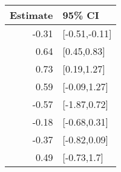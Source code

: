 \begin{tabular}{rl}
  \hline
Estimate & 95\% CI \\ 
  \hline
-0.31 & [-0.51,-0.11] \\ 
  0.64 & [0.45,0.83] \\ 
  0.73 & [0.19,1.27] \\ 
  0.59 & [-0.09,1.27] \\ 
  -0.57 & [-1.87,0.72] \\ 
  -0.18 & [-0.68,0.31] \\ 
  -0.37 & [-0.82,0.09] \\ 
  0.49 & [-0.73,1.7] \\ 
   \hline
\end{tabular}

